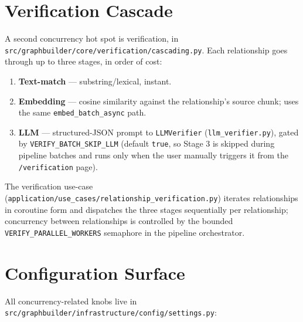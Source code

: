 \documentclass[11pt,a4paper]{article}
\begin{document}
\section{Verification Cascade}

A second concurrency hot spot is verification, in
\texttt{src/graphbuilder/core/verification/cascading.py}. Each
relationship goes through up to three stages, in order of cost:

\begin{enumerate}[leftmargin=*]
  \item \textbf{Text-match} --- substring/lexical, instant.
  \item \textbf{Embedding} --- cosine similarity against the
        relationship's source chunk; uses the same
        \texttt{embed\_batch\_async} path.
  \item \textbf{LLM} --- structured-JSON prompt to
        \texttt{LLMVerifier} (\texttt{llm\_verifier.py}), gated by
        \texttt{VERIFY\_BATCH\_SKIP\_LLM} (default \texttt{true}, so
        Stage 3 is skipped during pipeline batches and runs only when
        the user manually triggers it from the
        \texttt{/verification} page).
\end{enumerate}

The verification use-case
(\texttt{application/use\_cases/relationship\_verification.py}) iterates
relationships in coroutine form and dispatches the three stages
sequentially per relationship; concurrency between relationships is
controlled by the bounded
\texttt{VERIFY\_PARALLEL\_WORKERS} semaphore in the pipeline orchestrator.

\section{Configuration Surface}

All concurrency-related knobs live in
\texttt{src/graphbuilder/infrastructure/config/settings.py}:
\end{document}
